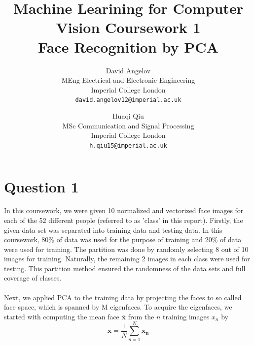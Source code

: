 \documentclass[10pt,twocolumn,letterpaper]{article}
\begin{document}
\title{Machine Learining for Computer Vision Coursework 1\\
	Face Recognition by PCA
	}

\author{David Angelov\\
MEng Electrical and Electronic Engineering \\
Imperial College London\\
{\tt\small david.angelov12@imperial.ac.uk}
\and
Huaqi Qiu\\
MSc Communication and Signal Processing\\
Imperial College London\\
{\tt\small h.qiu15@imperial.ac.uk}
}

\maketitle

\section{Question 1}
In this coursework, we were given 10 normalized and vectorized face images for each of the 52 different people (referred to as 'class' in this report). Firstly, the given data set was separated into training data and testing data. In this coursework, 80\% of data was used for the purpose of training and 20\% of data were used for training. The partition was done by randomly selecting 8 out of 10 images for training. Naturally, the remaining 2 images in each class were used for testing. This partition method ensured the randomness of the data sets and full coverage of classes.\\
\\
Next, we applied PCA to the training data by projecting the faces to so called face space, which is spanned by M eigenfaces. To acquire the eigenfaces, we started with computing the mean face $\boldsymbol{\bar{x}}$ from the $n$ training images $x_n$ by
\begin{equation}
 \boldsymbol{\bar{x}} = \frac{1}{N} \sum_{n=1}^N \boldsymbol{x_n}
 \label{eq:mean_face}
\end{equation}
\end{document}

